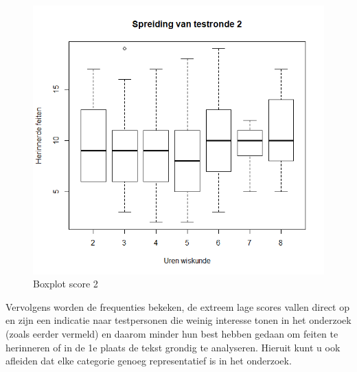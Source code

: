 \documentclass{hogent-article}
\begin{document}
	\begin{figure}[H]
		\includegraphics[width=\linewidth]{img/boxplot2.png}
		\caption{Boxplot score 2}
	\end{figure}

	Vervolgens worden de frequenties bekeken, de extreem lage scores vallen direct op en zijn een indicatie naar testpersonen die weinig interesse tonen in het onderzoek (zoals eerder vermeld) en daarom minder hun best hebben gedaan om feiten te herinneren of in de 1e plaats de tekst grondig te analyseren. Hieruit kunt u ook afleiden dat elke categorie genoeg representatief is in het onderzoek.
	
\end{document}
